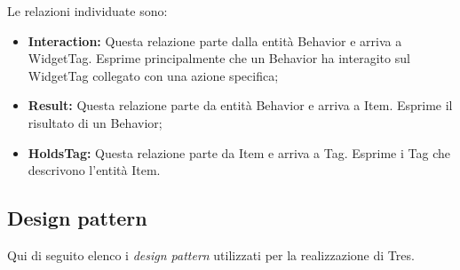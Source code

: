 Le relazioni individuate sono:
\begin{itemize}
\item \textbf{Interaction:} Questa relazione parte dalla entità Behavior e arriva a WidgetTag. Esprime principalmente che un Behavior ha interagito sul WidgetTag collegato con una azione specifica;
\item \textbf{Result:} Questa relazione parte da entità Behavior e arriva a Item. Esprime il risultato di un Behavior;
\item \textbf{HoldsTag:} Questa relazione parte da Item e arriva a Tag. Esprime i Tag che descrivono l'entità Item.
\end{itemize}

\newpage
\subsection{Design pattern}
Qui di seguito elenco i \emph{design pattern} utilizzati per la realizzazione di Tres.

